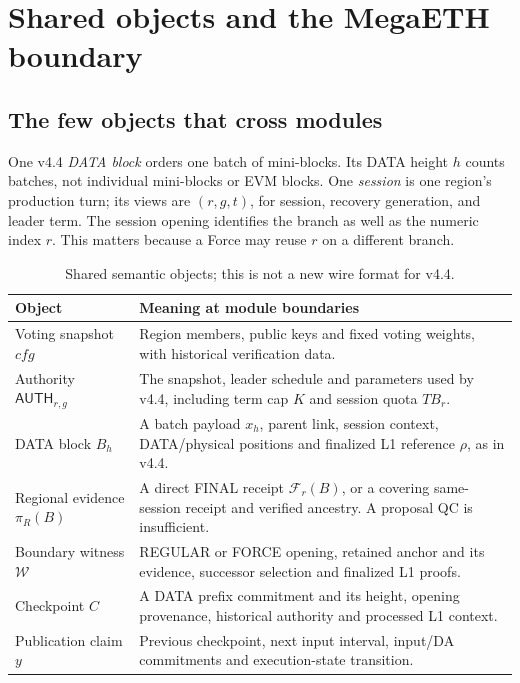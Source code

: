 \documentclass[11pt,a4paper]{article}
\newcommand{\api}[1]{\ensuremath{\mathsf{#1}}}
\newcommand{\FC}{\mathcal F}
\newcommand{\TB}{\mathit{TB}}
\begin{document}
\section{Shared objects and the MegaETH boundary}\label{sec:objects}
\subsection{The few objects that cross modules}
One v4.4 \emph{DATA block} orders one batch of mini-blocks. Its DATA
height $h$ counts batches, not individual mini-blocks or EVM blocks.
One \emph{session} is one region's production turn; its views are
$(r,g,t)$, for session, recovery generation, and leader term.
The session opening identifies the branch as well as the numeric index
$r$. This matters because a Force may reuse $r$ on a different branch.

\begin{table}[H]\centering\small
\begin{tabularx}{\linewidth}{@{}p{.23\linewidth}Y@{}}
\toprule Object & Meaning at module boundaries\\\midrule
Voting snapshot $\mathit{cfg}$ & Region members, public keys and fixed
voting weights, with historical verification data.\\
Authority $\api{AUTH}_{r,g}$ & The snapshot, leader schedule and parameters
used by v4.4, including term cap $K$ and session quota $\TB_r$.\\
DATA block $B_h$ & A batch payload $x_h$, parent link, session context,
DATA/physical positions and finalized L1 reference $\rho$, as in v4.4.\\
Regional evidence $\pi_R(B)$ & A direct FINAL receipt $\FC_r(B)$, or a
covering same-session receipt and verified ancestry. A proposal QC is
insufficient.\\
Boundary witness $\mathcal W$ & REGULAR or FORCE opening, retained anchor
and its evidence, successor selection and finalized L1 proofs.\\
Checkpoint $C$ & A DATA prefix commitment and its height, opening
provenance, historical authority and processed L1 context.\\
Publication claim $y$ & Previous checkpoint, next input interval,
input/DA commitments and execution-state transition.\\\bottomrule
\end{tabularx}
\caption{Shared semantic objects; this is not a new wire format for v4.4.}
\label{tab:objects}
\end{table}
\end{document}
